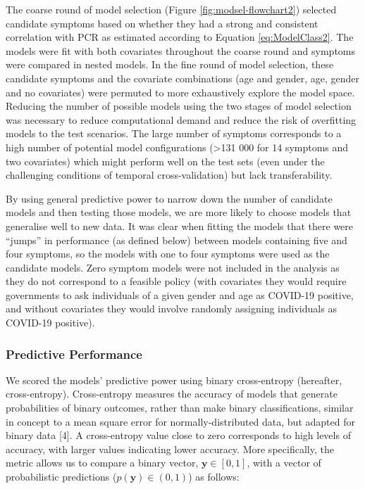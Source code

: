 \documentclass[]{elsarticle} %
\begin{document}
The coarse round of model selection (Figure \ref{fig:modsel-flowchart2}) selected candidate symptoms based on whether they had a strong and consistent correlation with PCR as estimated according to Equation \eqref{eq:ModelClass2}.
The models were fit with both covariates throughout the coarse round and symptoms were compared in nested models.
In the fine round of model selection, these candidate symptoms and the covariate combinations (age and gender, age, gender and no covariates) were permuted to more exhaustively explore the model space.
Reducing the number of possible models using the two stages of model selection was necessary to reduce computational demand and reduce the risk of overfitting models to the test scenarios.
The large number of symptoms corresponds to a high number of potential model configurations (\textgreater131 000 for 14 symptoms and two covariates) which might perform well on the test sets (even under the challenging conditions of temporal cross-validation) but lack transferability.

By using general predictive power to narrow down the number of candidate models and then testing those models, we are more likely to choose models that generalise well to new data.
It was clear when fitting the models that there were ``jumps'' in performance (as defined below) between models containing five and four symptoms, so the models with one to four symptoms were used as the candidate models.
Zero symptom models were not included in the analysis as they do not correspond to a feasible policy (with covariates they would require governments to ask individuals of a given gender and age as COVID-19 positive, and without covariates they would involve randomly assigning individuals as COVID-19 positive).

\hypertarget{predictive-performance}{%
\subsubsection{Predictive Performance}\label{predictive-performance}}

We scored the models' predictive power using binary cross-entropy (hereafter, cross-entropy).
Cross-entropy measures the accuracy of models that generate probabilities of binary outcomes, rather than make binary classifications, similar in concept to a mean square error for normally-distributed data, but adapted for binary data {[}4{]}.
A cross-entropy value close to zero corresponds to high levels of accuracy, with larger values indicating lower accuracy.
More specifically, the metric allows us to compare a binary vector, \(\boldsymbol{y}\in [0,1]\), with a vector of probabilistic predictions (\(p(\boldsymbol{y})\in (0,1)\)) as follows:
\end{document}
